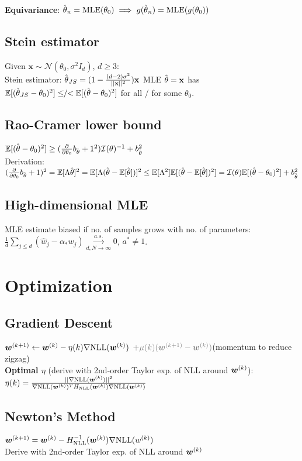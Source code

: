 \textbf{Equivariance}:
$\hat{\kern0pt \theta}_n = \textrm{MLE}(\theta_0) \implies g(\hat{\kern0pt \theta}_n) = \textrm{MLE}(g(\theta_0))$


\subsection*{Stein estimator}
Given $\mathbf{x} \sim \mathcal{N}(\theta_0, \sigma^2I_d)$, $d\geq3$:\\
Stein estimator: $\hat{\kern0pt \theta}_{JS} = (1-\frac{(d-2)\sigma^2}{||\mathbf{x}||^2})\mathbf{x}$
MLE $\hat{\kern0pt \theta} = \mathbf{x}$ has $\mathbb{E}[(\hat{\kern0pt \theta}_{JS} - \theta_0)^2] \leq\!\!/\!\!< \mathbb{E}[(\hat{\kern0pt \theta} - \theta_0)^2]$ for all / for some $\theta_0$.

% 
% 
\subsection*{Rao-Cramer lower bound}    
$\mathbb{E}[(\hat{\kern0pt \theta} - \theta_0)^2] \geq (\frac{\partial}{\partial\theta_0}b_{\hat{\kern0pt \theta}}+1^2)\mathcal{I}(\theta)^{-1} + b_{\hat{\kern0pt \theta}}^2$\\
Derivation: 
$(\frac{\partial}{\partial\theta_0}b_{\hat{\kern0pt \theta}}+1)^2 = 
 \mathbb{E}[\Lambda\hat{\kern0pt \theta}]^2 = \mathbb{E}[\Lambda(\hat{\kern0pt \theta} - \mathbb{E}[\hat{\kern0pt \theta}])]^2 \leq \mathbb{E}[\Lambda^2]\mathbb{E}[(\hat{\kern0pt \theta}-\mathbb{E}[\hat{\kern0pt \theta}])^2] = \mathcal{I}(\theta)\mathbb{E}[(\hat{\kern0pt \theta} - \theta_0)^2] + b_{\hat{\kern0pt \theta}}^2
$

\subsection*{High-dimensional MLE}
MLE estimate biased if no. of samples grows with no. of parameters:
$\frac{1}{d}\sum_{j\leq d}(\hat w_j-\alpha_* w_j)\overset{a.s.}{\underset{d,N\to\infty}{\to}}0$, $a^* \neq 1$.

\section*{Optimization}
\subsection*{Gradient Descent}
${\bm{w}}^{(k+1)} \leftarrow {\bm{w}}^{(k)} - \eta(k)\nabla\mathrm{NLL}({\bm{w}}^{(k)})$ {\color{gray}  $\color{gray}+ \mu(k)(\vw^{(k+1)} - \vw^{(k)})$}(momentum to reduce zigzag)\\
\textbf{Optimal $\eta$} (derive with 2nd-order Taylor exp. of NLL around ${\bm{w}}^{(k)}$):\\
$\eta(k)=\frac{||\nabla\mathrm{NLL}({\bm{w}}^{(k)})||^2}{\nabla\mathrm{NLL}({\bm{w}}^{(k)})^TH_{\mathrm{NLL}}({\bm{w}}^{(k)})\nabla\mathrm{NLL}({\bm{w}}^{(k)})}$

\subsection*{Newton's Method}
\mbox{${\bm{w}}^{(k+1)}={\bm{w}}^{(k)} - H_{\mathrm{NLL}}^{-1}({\bm{w}}^{(k)})\nabla\mathrm{NLL}(w^{(k)})$}\\
Derive with 2nd-order Taylor exp. of NLL around ${\bm{w}}^{(k)}$